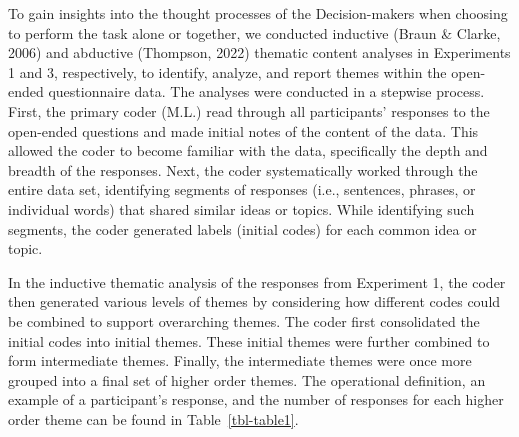 \documentclass[
  11pt,
  letterpaper,
]{article}
\begin{document}
To gain insights into the thought processes of the Decision-makers when
choosing to perform the task alone or together, we conducted inductive
(Braun \& Clarke, 2006) and abductive (Thompson, 2022) thematic content
analyses in Experiments 1 and 3, respectively, to identify, analyze, and
report themes within the open-ended questionnaire data. The analyses
were conducted in a stepwise process. First, the primary coder (M.L.)
read through all participants' responses to the open-ended questions and
made initial notes of the content of the data. This allowed the coder to
become familiar with the data, specifically the depth and breadth of the
responses. Next, the coder systematically worked through the entire data
set, identifying segments of responses (i.e., sentences, phrases, or
individual words) that shared similar ideas or topics. While identifying
such segments, the coder generated labels (initial codes) for each
common idea or topic.

In the inductive thematic analysis of the responses from Experiment 1,
the coder then generated various levels of themes by considering how
different codes could be combined to support overarching themes. The
coder first consolidated the initial codes into initial themes. These
initial themes were further combined to form intermediate themes.
Finally, the intermediate themes were once more grouped into a final set
of higher order themes. The operational definition, an example of a
participant's response, and the number of responses for each higher
order theme can be found in Table~\ref{tbl-table1}.

\clearpage
\begingroup
{}
\end{document}
